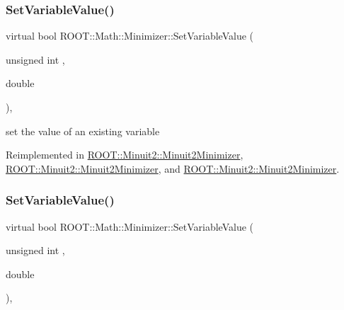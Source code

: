 \mbox{\label{classROOT_1_1Math_1_1Minimizer_a47e9a16c7a0b4ecfe769ee4be048d5c3}} 
\subsubsection{\texorpdfstring{SetVariableValue()}{SetVariableValue()}\hspace{0.1cm}{\footnotesize\ttfamily [2/3]}}
{\footnotesize\ttfamily virtual bool R\+O\+O\+T\+::\+Math\+::\+Minimizer\+::\+Set\+Variable\+Value (\begin{DoxyParamCaption}\item[{unsigned int}]{,  }\item[{double}]{ }\end{DoxyParamCaption})\hspace{0.3cm}{\ttfamily [inline]}, {\ttfamily [virtual]}}



set the value of an existing variable 



Reimplemented in \mbox{\hyperlink{classROOT_1_1Minuit2_1_1Minuit2Minimizer_a474e05b30c1227e9cc39fb597027f426}{R\+O\+O\+T\+::\+Minuit2\+::\+Minuit2\+Minimizer}}, \mbox{\hyperlink{classROOT_1_1Minuit2_1_1Minuit2Minimizer_a474e05b30c1227e9cc39fb597027f426}{R\+O\+O\+T\+::\+Minuit2\+::\+Minuit2\+Minimizer}}, and \mbox{\hyperlink{classROOT_1_1Minuit2_1_1Minuit2Minimizer_a474e05b30c1227e9cc39fb597027f426}{R\+O\+O\+T\+::\+Minuit2\+::\+Minuit2\+Minimizer}}.

\mbox{\label{classROOT_1_1Math_1_1Minimizer_a47e9a16c7a0b4ecfe769ee4be048d5c3}} 
\subsubsection{\texorpdfstring{SetVariableValue()}{SetVariableValue()}\hspace{0.1cm}{\footnotesize\ttfamily [3/3]}}
{\footnotesize\ttfamily virtual bool R\+O\+O\+T\+::\+Math\+::\+Minimizer\+::\+Set\+Variable\+Value (\begin{DoxyParamCaption}\item[{unsigned int}]{,  }\item[{double}]{ }\end{DoxyParamCaption})\hspace{0.3cm}{\ttfamily [inline]}, {\ttfamily [virtual]}}



